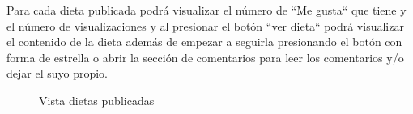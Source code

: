 Para cada dieta publicada podrá visualizar el número de ``Me gusta`` que tiene y el número de visualizaciones y al presionar el botón ``ver dieta`` podrá visualizar el contenido de la dieta además de empezar a seguirla presionando el botón con forma de estrella o abrir la sección de comentarios para leer los comentarios y/o dejar el suyo propio.
\begin{figure}[H]
    \centering
    \caption{Vista dietas publicadas}
    \label{fig:dietas_publicadas}
\end{figure}


